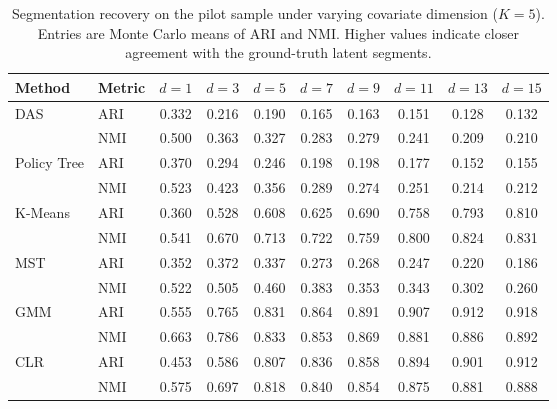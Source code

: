 \begin{table}[htbp]
\centering
\caption{Segmentation recovery on the pilot sample under varying covariate dimension ($K=5$). Entries are Monte Carlo means of ARI and NMI. Higher values indicate closer agreement with the ground-truth latent segments.}
\label{tab:app-ari-nmi-varying-d}
\begin{tabular}{llcccccccc}
\toprule
Method & Metric & $d=1$ & $d=3$ & $d=5$ & $d=7$ & $d=9$ & $d=11$ & $d=13$ & $d=15$ \\
\midrule
DAS & ARI & 0.332 & 0.216 & 0.190 & 0.165 & 0.163 & 0.151 & 0.128 & 0.132 \\
 & NMI & 0.500 & 0.363 & 0.327 & 0.283 & 0.279 & 0.241 & 0.209 & 0.210 \\
\addlinespace
Policy Tree & ARI & 0.370 & 0.294 & 0.246 & 0.198 & 0.198 & 0.177 & 0.152 & 0.155 \\
 & NMI & 0.523 & 0.423 & 0.356 & 0.289 & 0.274 & 0.251 & 0.214 & 0.212 \\
\addlinespace
K-Means & ARI & 0.360 & 0.528 & 0.608 & 0.625 & 0.690 & 0.758 & 0.793 & 0.810 \\
 & NMI & 0.541 & 0.670 & 0.713 & 0.722 & 0.759 & 0.800 & 0.824 & 0.831 \\
\addlinespace
MST & ARI & 0.352 & 0.372 & 0.337 & 0.273 & 0.268 & 0.247 & 0.220 & 0.186 \\
 & NMI & 0.522 & 0.505 & 0.460 & 0.383 & 0.353 & 0.343 & 0.302 & 0.260 \\
\addlinespace
GMM & ARI & 0.555 & 0.765 & 0.831 & 0.864 & 0.891 & 0.907 & 0.912 & 0.918 \\
 & NMI & 0.663 & 0.786 & 0.833 & 0.853 & 0.869 & 0.881 & 0.886 & 0.892 \\
\addlinespace
CLR & ARI & 0.453 & 0.586 & 0.807 & 0.836 & 0.858 & 0.894 & 0.901 & 0.912 \\
 & NMI & 0.575 & 0.697 & 0.818 & 0.840 & 0.854 & 0.875 & 0.881 & 0.888 \\
\bottomrule
\end{tabular}
\end{table}

